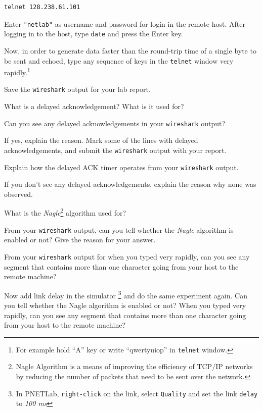 \documentclass{UTNetLab}
\begin{document}
	\begin{lstlisting}[emph={h1,netlab}]
	telnet 128.238.61.101
	\end{lstlisting}

	Enter \lstinline[emph={netlab}]{"netlab"} as username and password for login in the remote host. After logging in to the host, type \lstinline{date} and press the {Enter} key.

    Now, in order to generate data faster than the round-trip time of a single byte to be sent and echoed, type any sequence of keys in the \lstinline{telnet} window very rapidly.\footnote{For example hold ``A'' key or write ``qwertyuiop'' in \lstinline{telnet} window.}

    {Save} the \lstinline{wireshark} output for your lab report.
    
    \begin{report}
        \item What is a delayed acknowledgement?
            What is it used for?
        
        \item Can you see any delayed acknowledgements in your \lstinline{wireshark} output?

            If yes, explain the reason.
            Mark some of the lines with delayed acknowledgements, and submit the \lstinline{wireshark} output with your report.

            Explain how the delayed ACK timer operates from your \lstinline{wireshark} output.

            If you don’t see any delayed acknowledgements, explain the reason why none was observed.
        
        \item What is the \textit{Nagle}\footnote{Nagle Algorithm is a means of improving the efficiency of TCP/IP networks by reducing the number of packets that need to be sent over the network.} algorithm used for?

            From your \lstinline{wireshark} output, can you tell whether the \textit{Nagle} algorithm is enabled or not? Give the reason for your answer.

            From your \lstinline{wireshark} output for when you typed very rapidly, can you see any segment that contains more than one character going from your host to the remote machine?
            
            Now add link delay in the simulator \footnote{In PNETLab, \lstinline{right-click} on the link, select \lstinline{Quality} and set the link \lstinline{delay} to \textit{100 ms}} and do the same experiment again. Can you tell whether the Nagle algorithm is enabled or not? When you typed very rapidly, can you see any segment that contains more than one character going from your host to the remote machine?
    \end{report}
\end{document}

